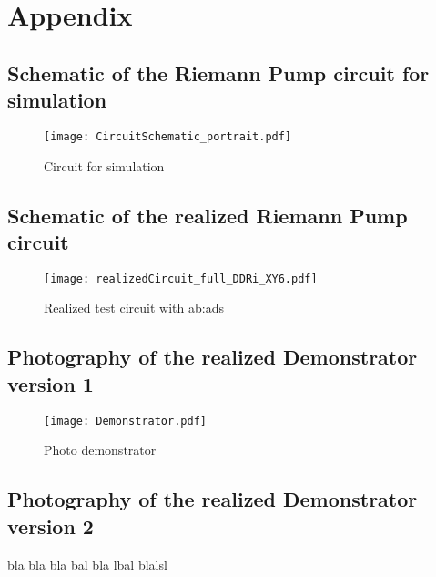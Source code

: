 \renewcommand*\thechapter{}
\renewcommand*\thesection{\Alph{section}}
\chapter*{Appendix}

\section{Schematic of the Riemann Pump circuit for simulation}
\label{app:schematic}
\begin{figure}[H]
	\centering
  \texttt{[image: CircuitSchematic\_portrait.pdf]}
	\caption{Circuit for simulation}
	\label{fig:Circuitschematic}
\end{figure}

\section{Schematic of the realized Riemann Pump circuit}
\label{app:schematicRealizedPump}
\begin{figure}[H]
	\centering
  \texttt{[image: realizedCircuit\_full\_DDRi\_XY6.pdf]}
	\caption{Realized test circuit with \gls{ab:ads}}
	\label{fig:RealCircuitschematic}
\end{figure}



\section{Photography of the realized Demonstrator version 1}

\begin{figure}[H]
   \centering
   \texttt{[image: Demonstrator.pdf]}
   \caption{Photo demonstrator}
   \label{pic:DemonstratorDDRiXY6}
\end{figure}

\newpage
\section{Photography of the realized Demonstrator version 2}

bla bla bla bal bla lbal blalsl
\newpage
